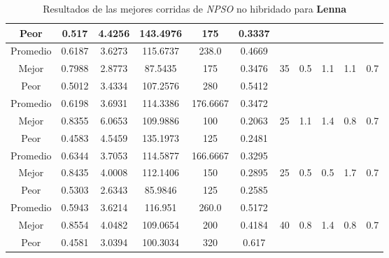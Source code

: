 \begin{table}[h!]
\begin{center}
\begin{tabular}{|c|c|c|c|c|c|c|c|c|c|c|}
            Peor & 0.517 & 4.4256  & 143.4976 & 175 & 0.3337 &  &  &  &  & \\
        \hline
        \hline
            Promedio  & 0.6187 & 3.6273 & 115.6737 & 238.0 & 0.4669 &  &  &  &  & \\
            \cline{1-6}
            Mejor & 0.7988 & 2.8773  & 87.5435 & 175 & 0.3476 & 35 & 0.5 & 1.1 & 1.1 & 0.7\\
            \cline{1-6}
            Peor & 0.5012 & 3.4334  & 107.2576 & 280 & 0.5412 &  &  &  &  & \\
        \hline
        \hline
            Promedio  & 0.6198 & 3.6931 & 114.3386 & 176.6667 & 0.3472 &  &  &  &  & \\
            \cline{1-6}
            Mejor & 0.8355 & 6.0653  & 109.9886 & 100 & 0.2063 & 25 & 1.1 & 1.4 & 0.8 & 0.7\\
            \cline{1-6}
            Peor & 0.4583 & 4.5459  & 135.1973 & 125 & 0.2481 &  &  &  &  & \\
        \hline
        \hline
            Promedio  & 0.6344 & 3.7053 & 114.5877 & 166.6667 & 0.3295 &  &  &  &  & \\
            \cline{1-6}
            Mejor & 0.8435 & 4.0008  & 112.1406 & 150 & 0.2895 & 25 & 0.5 & 0.5 & 1.7 & 0.7\\
            \cline{1-6}
            Peor & 0.5303 & 2.6343  & 85.9846 & 125 & 0.2585 &  &  &  &  & \\
        \hline
        \hline
            Promedio  & 0.5943 & 3.6214 & 116.951 & 260.0 & 0.5172 &  &  &  &  & \\
            \cline{1-6}
            Mejor & 0.8554 & 4.0482  & 109.0654 & 200 & 0.4184 & 40 & 0.8 & 1.4 & 0.8 & 0.7\\
            \cline{1-6}
            Peor & 0.4581 & 3.0394  & 100.3034 & 320 & 0.617 &  &  &  &  & \\
        \hline
        \end{tabular}
        \caption{Resultados de las mejores corridas de \emph{NPSO} no hibridado para {\bf Lenna}}
        \label{tb:tablepsoalgimg}
    \end{center}
\end{table}


